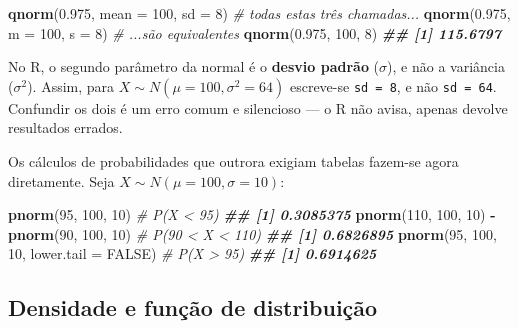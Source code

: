 \documentclass[
  portuguese,
  11pt,
  openany]{book}
\newenvironment{Shaded}{\begin{snugshade}}{\end{snugshade}}
\newcommand{\AttributeTok}[1]{\textcolor[rgb]{0.13,0.29,0.53}{#1}}
\newcommand{\CommentTok}[1]{\textcolor[rgb]{0.56,0.35,0.01}{\textit{#1}}}
\newcommand{\ConstantTok}[1]{\textcolor[rgb]{0.56,0.35,0.01}{#1}}
\newcommand{\DecValTok}[1]{\textcolor[rgb]{0.00,0.00,0.81}{#1}}
\newcommand{\DocumentationTok}[1]{\textcolor[rgb]{0.56,0.35,0.01}{\textbf{\textit{#1}}}}
\newcommand{\FloatTok}[1]{\textcolor[rgb]{0.00,0.00,0.81}{#1}}
\newcommand{\FunctionTok}[1]{\textcolor[rgb]{0.13,0.29,0.53}{\textbf{#1}}}
\newcommand{\NormalTok}[1]{#1}
\newcommand{\SpecialCharTok}[1]{\textcolor[rgb]{0.81,0.36,0.00}{\textbf{#1}}}
\begin{document}
\begin{Shaded}
\begin{Highlighting}[]
\FunctionTok{qnorm}\NormalTok{(}\FloatTok{0.975}\NormalTok{, }\AttributeTok{mean =} \DecValTok{100}\NormalTok{, }\AttributeTok{sd =} \DecValTok{8}\NormalTok{)   }\CommentTok{\# todas estas três chamadas...}
\FunctionTok{qnorm}\NormalTok{(}\FloatTok{0.975}\NormalTok{, }\AttributeTok{m =} \DecValTok{100}\NormalTok{, }\AttributeTok{s =} \DecValTok{8}\NormalTok{)       }\CommentTok{\# ...são equivalentes}
\FunctionTok{qnorm}\NormalTok{(}\FloatTok{0.975}\NormalTok{, }\DecValTok{100}\NormalTok{, }\DecValTok{8}\NormalTok{)}
\DocumentationTok{\#\# [1] 115.6797}
\end{Highlighting}
\end{Shaded}

No R, o segundo parâmetro da normal é o \textbf{desvio padrão} (\(\sigma\)), e não a variância
(\(\sigma^2\)). Assim, para \(X \sim N(\mu = 100, \sigma^2 = 64)\) escreve-se
\texttt{sd\ =\ 8}, e não \texttt{sd\ =\ 64}. Confundir os dois é um erro comum e silencioso --- o R não
avisa, apenas devolve resultados errados.

Os cálculos de probabilidades que outrora exigiam tabelas fazem-se agora diretamente.
Seja \(X \sim N(\mu = 100, \sigma = 10)\):

\begin{Shaded}
\begin{Highlighting}[]
\FunctionTok{pnorm}\NormalTok{(}\DecValTok{95}\NormalTok{, }\DecValTok{100}\NormalTok{, }\DecValTok{10}\NormalTok{)                          }\CommentTok{\# P(X \textless{} 95)}
\DocumentationTok{\#\# [1] 0.3085375}
\FunctionTok{pnorm}\NormalTok{(}\DecValTok{110}\NormalTok{, }\DecValTok{100}\NormalTok{, }\DecValTok{10}\NormalTok{) }\SpecialCharTok{{-}} \FunctionTok{pnorm}\NormalTok{(}\DecValTok{90}\NormalTok{, }\DecValTok{100}\NormalTok{, }\DecValTok{10}\NormalTok{)    }\CommentTok{\# P(90 \textless{} X \textless{} 110)}
\DocumentationTok{\#\# [1] 0.6826895}
\FunctionTok{pnorm}\NormalTok{(}\DecValTok{95}\NormalTok{, }\DecValTok{100}\NormalTok{, }\DecValTok{10}\NormalTok{, }\AttributeTok{lower.tail =} \ConstantTok{FALSE}\NormalTok{)      }\CommentTok{\# P(X \textgreater{} 95)}
\DocumentationTok{\#\# [1] 0.6914625}
\end{Highlighting}
\end{Shaded}

\subsection{Densidade e função de distribuição}\label{densidade-e-funuxe7uxe3o-de-distribuiuxe7uxe3o}
\end{document}
